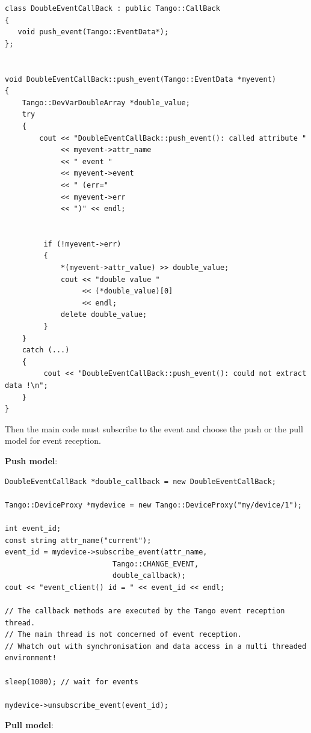 \begin{verbatim}
class DoubleEventCallBack : public Tango::CallBack 
{
   void push_event(Tango::EventData*);
}; 
 

void DoubleEventCallBack::push_event(Tango::EventData *myevent)
{
    Tango::DevVarDoubleArray *double_value;
    try
    {
        cout << "DoubleEventCallBack::push_event(): called attribute " 
             << myevent->attr_name
             << " event "
             << myevent->event 
             << " (err="
             << myevent->err
             << ")" << endl;
 

         if (!myevent->err)
         {
             *(myevent->attr_value) >> double_value;
             cout << "double value "
                  << (*double_value)[0]
                  << endl;
             delete double_value;
         }
    }
    catch (...)
    {
         cout << "DoubleEventCallBack::push_event(): could not extract data !\n";
    }
}
\end{verbatim}


Then the main code must subscribe to the event
and choose the push or the pull model for event reception.

\textbf{Push model}:


\begin{verbatim}
DoubleEventCallBack *double_callback = new DoubleEventCallBack; 
      
Tango::DeviceProxy *mydevice = new Tango::DeviceProxy("my/device/1");
 
int event_id;
const string attr_name("current");
event_id = mydevice->subscribe_event(attr_name, 
                         Tango::CHANGE_EVENT,
                         double_callback);
cout << "event_client() id = " << event_id << endl;

// The callback methods are executed by the Tango event reception thread.
// The main thread is not concerned of event reception.
// Whatch out with synchronisation and data access in a multi threaded environment!

sleep(1000); // wait for events
 
mydevice->unsubscribe_event(event_id);
\end{verbatim}


\textbf{Pull model}:


